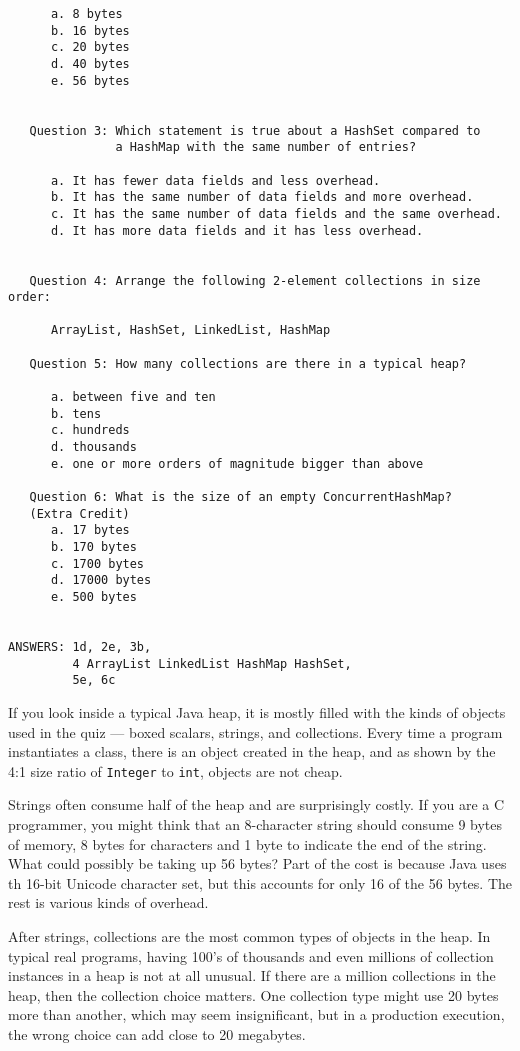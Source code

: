 \begin{itemize}
\begin{verbatim}
      a. 8 bytes
      b. 16 bytes
      c. 20 bytes
      d. 40 bytes
      e. 56 bytes
 
   
   Question 3: Which statement is true about a HashSet compared to 
               a HashMap with the same number of entries?
               
      a. It has fewer data fields and less overhead.
      b. It has the same number of data fields and more overhead.
      c. It has the same number of data fields and the same overhead.
      d. It has more data fields and it has less overhead.
                  
                       
   Question 4: Arrange the following 2-element collections in size order:
    
      ArrayList, HashSet, LinkedList, HashMap
          
   Question 5: How many collections are there in a typical heap?
   
      a. between five and ten
      b. tens
      c. hundreds
      d. thousands
      e. one or more orders of magnitude bigger than above

   Question 6: What is the size of an empty ConcurrentHashMap?
   (Extra Credit)
      a. 17 bytes
      b. 170 bytes
      c. 1700 bytes
      d. 17000 bytes
      e. 500 bytes
           

ANSWERS: 1d, 2e, 3b, 
         4 ArrayList LinkedList HashMap HashSet, 
         5e, 6c                 
\end{verbatim}

If you look inside a typical Java heap, it is mostly filled with the kinds of objects used in the quiz --- boxed scalars, strings, and collections. Every time a program instantiates a class, there is an object created in the heap, and as shown by the 4:1 size ratio of \texttt{Integer} to \texttt{int}, objects are not cheap. 

Strings often consume half of the heap and are surprisingly costly. If you are a C programmer, you might think that an 8-character string should consume 9 bytes of memory, 8 bytes for characters and 1 byte to indicate the end of the string. What could possibly be taking up 56 bytes? Part of the cost is because Java uses th 16-bit Unicode character set, but this accounts for only 16 of the 56 bytes. The rest is various kinds of overhead.

After strings, collections are the most common types of objects in the heap. In typical real programs, having 100's of thousands and even millions of collection instances in a heap is not at all unusual. If there are a million collections in the heap, then the collection choice matters. One collection type might use 20 bytes more than another, which may seem insignificant, but in a production execution, the wrong choice can add close to 20 megabytes.


\end{itemize}
